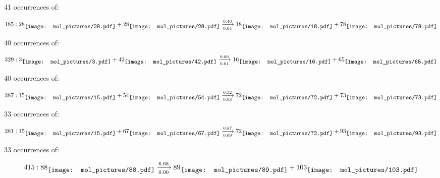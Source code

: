 \documentclass{article}
\begin{document}
\vspace{1cm}


41 occurrences of:

$$
185:  
28
\raisebox{-.5\height}{\texttt{[image: mol\_pictures/28.pdf]}}
+
28
\raisebox{-.5\height}{\texttt{[image: mol\_pictures/28.pdf]}}
\xrightarrow[0.04]{0.40}
18
\raisebox{-.5\height}{\texttt{[image: mol\_pictures/18.pdf]}}
+
78
\raisebox{-.5\height}{\texttt{[image: mol\_pictures/78.pdf]}}
$$



\vspace{1cm}


40 occurrences of:

$$
329:  
3
\raisebox{-.5\height}{\texttt{[image: mol\_pictures/3.pdf]}}
+
42
\raisebox{-.5\height}{\texttt{[image: mol\_pictures/42.pdf]}}
\xrightarrow[0.01]{0.06}
16
\raisebox{-.5\height}{\texttt{[image: mol\_pictures/16.pdf]}}
+
65
\raisebox{-.5\height}{\texttt{[image: mol\_pictures/65.pdf]}}
$$



\vspace{1cm}


40 occurrences of:

$$
287:  
15
\raisebox{-.5\height}{\texttt{[image: mol\_pictures/15.pdf]}}
+
54
\raisebox{-.5\height}{\texttt{[image: mol\_pictures/54.pdf]}}
\xrightarrow[0.03]{0.32}
72
\raisebox{-.5\height}{\texttt{[image: mol\_pictures/72.pdf]}}
+
73
\raisebox{-.5\height}{\texttt{[image: mol\_pictures/73.pdf]}}
$$



\vspace{1cm}


33 occurrences of:

$$
281:  
15
\raisebox{-.5\height}{\texttt{[image: mol\_pictures/15.pdf]}}
+
67
\raisebox{-.5\height}{\texttt{[image: mol\_pictures/67.pdf]}}
\xrightarrow[0.09]{0.87}
72
\raisebox{-.5\height}{\texttt{[image: mol\_pictures/72.pdf]}}
+
93
\raisebox{-.5\height}{\texttt{[image: mol\_pictures/93.pdf]}}
$$



\vspace{1cm}


33 occurrences of:

$$
415:  
88
\raisebox{-.5\height}{\texttt{[image: mol\_pictures/88.pdf]}}
\xrightarrow[0.00]{6.68}
89
\raisebox{-.5\height}{\texttt{[image: mol\_pictures/89.pdf]}}
+
103
\raisebox{-.5\height}{\texttt{[image: mol\_pictures/103.pdf]}}
$$
\end{document}
